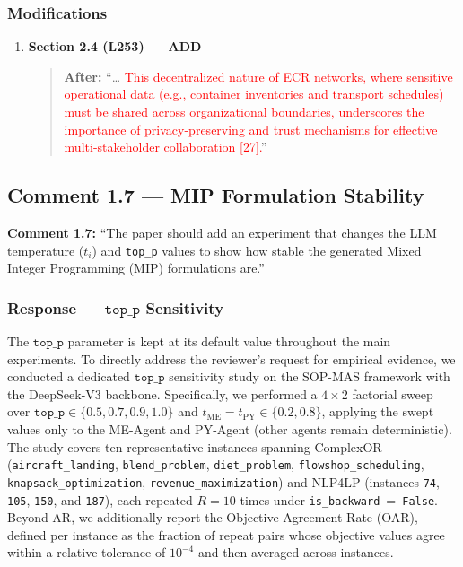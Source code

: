\documentclass[11pt,a4paper]{article}
\begin{document}
\subsubsection{Modifications}
\begin{enumerate}
\item \textbf{Section 2.4 (L253) --- ADD}
\begin{quote}
\textbf{After:} ``\ldots{} \textcolor{red}{This decentralized nature of ECR networks, where sensitive operational data (e.g., container inventories and transport schedules) must be shared across organizational boundaries, underscores the importance of privacy-preserving and trust mechanisms for effective multi-stakeholder collaboration [27].}''\end{quote}
\end{enumerate}




\subsection{Comment 1.7 --- MIP Formulation Stability}
\textbf{Comment 1.7: }``The paper should add an experiment that changes the LLM temperature ($t_i$) and \texttt{top\_p} values to show how stable the generated Mixed Integer Programming (MIP) formulations are.''

\subsubsection{Response --- $\texttt{top\_p}$ Sensitivity}

The $\texttt{top\_p}$ parameter is kept at its default value throughout the main experiments. To directly address the reviewer's request for empirical evidence, we conducted a dedicated $\texttt{top\_p}$ sensitivity study on the SOP-MAS framework with the DeepSeek-V3 backbone. Specifically, we performed a $4 \times 2$ factorial sweep over $\texttt{top\_p} \in \{0.5, 0.7, 0.9, 1.0\}$ and $t_\text{ME} = t_\text{PY} \in \{0.2, 0.8\}$, applying the swept values only to the ME-Agent and PY-Agent (other agents remain deterministic). The study covers ten representative instances spanning ComplexOR (\texttt{aircraft\_landing}, \texttt{blend\_problem}, \texttt{diet\_problem}, \texttt{flowshop\_scheduling}, \texttt{knapsack\_optimization}, \texttt{revenue\_maximization}) and NLP4LP (instances \texttt{74}, \texttt{105}, \texttt{150}, and \texttt{187}), each repeated $R{=}10$ times under \texttt{is\_backward}~=~\texttt{False}. Beyond AR, we additionally report the Objective-Agreement Rate (OAR), defined per instance as the fraction of repeat pairs whose objective values agree within a relative tolerance of $10^{-4}$ and then averaged across instances.
\end{document}
